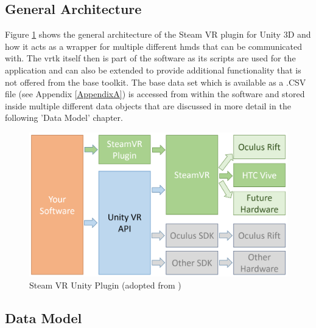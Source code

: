 \subsection{General Architecture}

Figure \ref{fig:steamvrselected} shows the general architecture of the Steam VR plugin for Unity 3D and how it acts as a wrapper for multiple different \glspl{hmd} that can be communicated with. The \gls{vrtk} itself then is part of the software as its scripts are used for the application and can also be extended to provide additional functionality that is not offered from the base toolkit. The base data set which is available as a .CSV file (see Appendix \ref{AppendixA}) is accessed from within the software and stored inside multiple different data objects that are discussed in more detail in the following 'Data Model' chapter.

\begin{figure}[h]
	\begin{center}
		\includegraphics[width=14cm]{03_Figures/04_Valve/OpenVR_SteamVR_selected.png}
		\caption[Steam VR Unity Plugin]{Steam VR Unity Plugin (adopted from \cite{Valve2016})}
		\label{fig:steamvrselected}
	\end{center}
\end{figure}




\subsection{Data Model}


